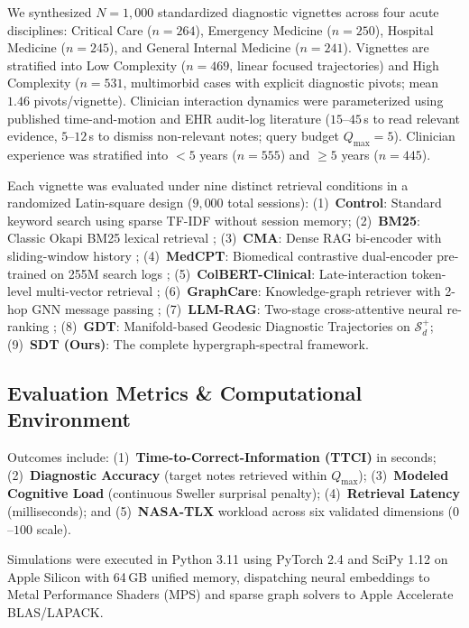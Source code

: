 \documentclass[12pt]{article}
\begin{document}
We synthesized $N = 1{,}000$ standardized diagnostic vignettes across four acute disciplines: Critical Care ($n=264$), Emergency Medicine ($n=250$), Hospital Medicine ($n=245$), and General Internal Medicine ($n=241$). Vignettes are stratified into Low Complexity ($n=469$, linear focused trajectories) and High Complexity ($n=531$, multimorbid cases with explicit diagnostic pivots; mean $1.46$ pivots/vignette). Clinician interaction dynamics were parameterized using published time-and-motion and EHR audit-log literature \cite{sinsky2016allocation,zheng2021analyzing,harry2018cognitive} ($15$--$45$\,s to read relevant evidence, $5$--$12$\,s to dismiss non-relevant notes; query budget $Q_{\max} = 5$). Clinician experience was stratified into $<5$ years ($n=555$) and $\ge 5$ years ($n=445$).

Each vignette was evaluated under nine distinct retrieval conditions in a randomized Latin-square design ($9{,}000$ total sessions):
(1)~\textbf{Control}: Standard keyword search using sparse TF-IDF without session memory;
(2)~\textbf{BM25}: Classic Okapi BM25 lexical retrieval \cite{baeza1999modern};
(3)~\textbf{CMA}: Dense RAG bi-encoder with sliding-window history \cite{lewis2020retrieval};
(4)~\textbf{MedCPT}: Biomedical contrastive dual-encoder pre-trained on 255M search logs \cite{jin2023medcpt};
(5)~\textbf{ColBERT-Clinical}: Late-interaction token-level multi-vector retrieval \cite{santhanam2022colbertv2};
(6)~\textbf{GraphCare}: Knowledge-graph retriever with 2-hop GNN message passing \cite{jiang2024graphcare};
(7)~\textbf{LLM-RAG}: Two-stage cross-attentive neural re-ranking \cite{eickhoff2024ehrrag,zakka2024almanac};
(8)~\textbf{GDT}: Manifold-based Geodesic Diagnostic Trajectories on $\mathcal{S}_d^+$;
(9)~\textbf{SDT (Ours)}: The complete hypergraph-spectral framework.

\subsection*{Evaluation Metrics \& Computational Environment}
Outcomes include: (1)~\textbf{Time-to-Correct-Information (TTCI)} in seconds; (2)~\textbf{Diagnostic Accuracy} (target notes retrieved within $Q_{\max}$); (3)~\textbf{Modeled Cognitive Load} (continuous Sweller surprisal penalty); (4)~\textbf{Retrieval Latency} (milliseconds); and (5)~\textbf{NASA-TLX} workload across six validated dimensions \cite{hart1988development,tubbs2020balancing} ($0$--$100$ scale). 

Simulations were executed in Python 3.11 using PyTorch 2.4 and SciPy 1.12 on Apple Silicon with 64\,GB unified memory, dispatching neural embeddings to Metal Performance Shaders (MPS) and sparse graph solvers to Apple Accelerate BLAS/LAPACK.
\end{document}
